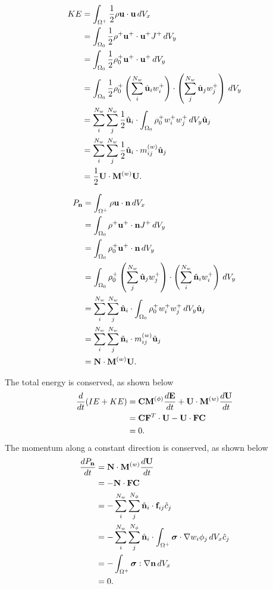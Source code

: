 \documentclass[11pt]{article}
\begin{document}
\begin{align}
    KE &= \int_{\Omega^+} \frac{1}{2} \rho \mathbf{u} \cdot \mathbf{u} \, dV_x \nonumber \\
    &= \int_{\Omega_0} \frac{1}{2} \rho^+ \mathbf{u}^+ \cdot \mathbf{u}^+ J^+ \, dV_y \nonumber \\
    &= \int_{\Omega_0} \frac{1}{2} \rho_0^+ \mathbf{u}^+ \cdot \mathbf{u}^+ \, dV_y \nonumber \\
    &= \int_{\Omega_0} \frac{1}{2} \rho_0^+ \left ( \sum_i^{N_w} \hat{\mathbf{u}}_i w_i^+ \right ) \cdot \left ( \sum_j^{N_w} \hat{\mathbf{u}}_j w_j^+ \right ) \, dV_y \nonumber \\
    &= \sum_i^{N_w} \sum_j^{N_w} \frac{1}{2} \hat{\mathbf{u}}_i \cdot \int_{\Omega_0}\rho_0^+ w_i^+ w_j^+ \, dV_y \hat{\mathbf{u}}_j \nonumber \\
    &= \sum_i^{N_w} \sum_j^{N_w} \frac{1}{2} \hat{\mathbf{u}}_i \cdot m_{ij}^{(w)} \hat{\mathbf{u}}_j \nonumber \\
    &= \frac{1}{2} \mathbf{U} \cdot \mathbf{M}^{(w)} \mathbf{U}.
\end{align}

\begin{align}
    P_{\mathbf{n}} &= \int_{\Omega^+} \rho \mathbf{u} \cdot \mathbf{n} \, dV_x \nonumber \\
    &= \int_{\Omega_0} \rho^+ \mathbf{u}^+ \cdot \mathbf{n} J^+ \, dV_y \nonumber \\
    &= \int_{\Omega_0} \rho^+_0 \mathbf{u}^+ \cdot \mathbf{n} \, dV_y \nonumber \\
    &= \int_{\Omega_0} \rho^+_0 \left ( \sum_j^{N_w} \hat{\mathbf{u}}_j w^+_j \right ) \cdot \left ( \sum_i^{N_w} \hat{\mathbf{n}}_i w_i^+ \right ) \, dV_y \nonumber \\
    &= \sum_i^{N_w} \sum_j^{N_w} \hat{\mathbf{n}}_i \cdot \int_{\Omega_0} \rho_0^+ w_i^+ w_j^+ \, dV_y \hat{\mathbf{u}}_j \nonumber \\
    &= \sum_i^{N_w} \sum_j^{N_w} \hat{\mathbf{n}}_i \cdot m_{ij}^{(w)} \hat{\mathbf{u}}_j \nonumber \\
    &= \mathbf{N} \cdot \mathbf{M}^{(w)} \mathbf{U}.
\end{align}

The total energy is conserved, as shown below
\begin{align}
    \frac{d}{dt} (IE + KE) &= \mathbf{C} \mathbf{M}^{(\phi)} \frac{d\mathbf{E}}{dt} + \mathbf{U} \cdot \mathbf{M}^{(w)} \frac{d\mathbf{U}}{dt} \nonumber \\
    &= \mathbf{C} \mathbf{F}^T \cdot \mathbf{U} - \mathbf{U} \cdot \mathbf{F} \mathbf{C} \nonumber \\
    &= 0.
\end{align}
The momentum along a constant direction is conserved, as shown below
\begin{align}
    \frac{d P_{\mathbf{n}}}{dt} &= \mathbf{N} \cdot \mathbf{M}^{(w)} \frac{d \mathbf{U}}{dt} \nonumber \\
    &= -\mathbf{N} \cdot \mathbf{F} \mathbf{C} \nonumber \\
    &= -\sum_i^{N_w} \sum_j^{N_\phi} \hat{\mathbf{n}}_i \cdot \mathbf{f}_{ij} \hat{c}_j \nonumber \\
    &= -\sum_i^{N_w} \sum_j^{N_\phi} \hat{\mathbf{n}}_i \cdot \int_{\Omega^+} \bm \sigma \cdot \nabla w_i \phi_j \, dV_x \hat{c}_j \nonumber \\
    &= -\int_{\Omega^+} \bm \sigma : \nabla \mathbf{n} \, dV_x \nonumber \\
    &= 0.
\end{align}
\end{document}

